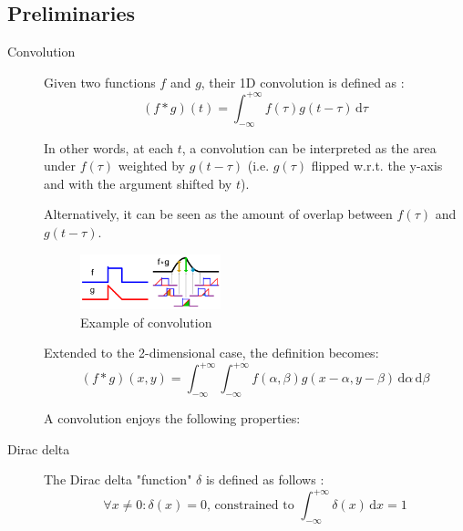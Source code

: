 \subsection{Preliminaries}

\begin{description}
    \item[Convolution] 
        Given two functions $f$ and $g$, their 1D convolution is defined as \cite{wiki:1d_convolution}:
        \[ (f * g)(t) = \int_{-\infty}^{+\infty} f(\tau)g(t - \tau) \,\text{d}\tau  \]

        In other words, at each $t$, a convolution can be interpreted as the area under $f(\tau)$ 
        weighted by $g(t - \tau)$ (i.e. $g(\tau)$ flipped w.r.t. the y-axis and with the argument shifted by $t$).

        Alternatively, it can be seen as the amount of overlap between $f(\tau)$ and $g(t - \tau)$.

        \begin{figure}[h]
            \centering
            \includegraphics[width=0.4\textwidth]{./img/continuous_convolution_example.png}
            \caption{Example of convolution}
        \end{figure}

        Extended to the 2-dimensional case, the definition becomes:
        \[ (f * g)(x, y) = \int_{-\infty}^{+\infty} \int_{-\infty}^{+\infty} f(\alpha, \beta)g(x-\alpha, y-\beta) \,\text{d}\alpha\,\text{d}\beta  \]
        
        A convolution enjoys the following properties: 

    \item[Dirac delta] 
        The Dirac delta "function" $\delta$ is defined as follows \cite{wiki:dirac,book:sonka}:
        \[ \forall x \neq 0: \delta(x) = 0 \text{, constrained to } \int_{-\infty}^{+\infty} \delta(x) \,\text{d}x = 1 \]


\end{description}
